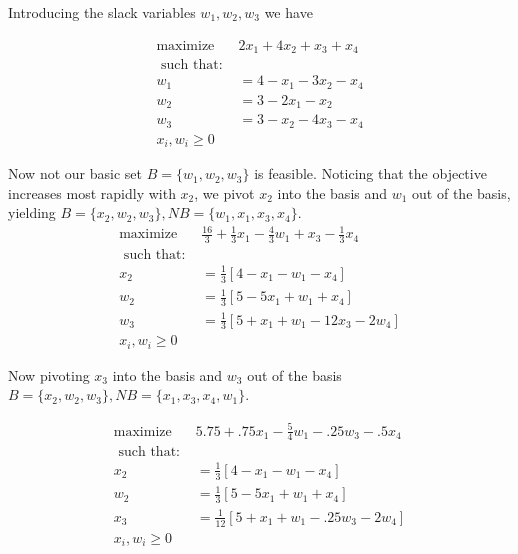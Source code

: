 \documentclass{article} %
\begin{document}
\begin{enumerate}
Introducing the slack variables $w_1,w_2, w_3$ we have

\begin{equation*}
\begin{aligned}
\mbox{maximize } &2x_1 + 4x_2+ x_3 + x_4 \\ 
\mbox{ such that: } & \\ 
w_1 &= 4 - x_1 - 3 x_2 - x_4 \\ 
w_2 &= 3 - 2x_1 - x_2 \\
w_3 &= 3 - x_2 - 4x_3 - x_4  \\ 
x_i, w_i \geq 0
\end{aligned}
\end{equation*}

Now not our basic set $B = \{ w_1, w_2, w_3 \}$ is feasible. Noticing that the objective increases most rapidly with $x_2$, we pivot $x_2$ into the basis and $w_1$ out of the basis, yielding $B = \{ x_2, w_2, w_3 \}, NB = \{w_1, x_1, x_3, x_4 \}$.
\begin{equation*}
\begin{aligned}
\mbox{maximize } & \frac{16}{3}  + \frac{1}{3} x_1 - \frac{4}{3}w_1+ x_3 - \frac{1}{3} x_4 \\ 
\mbox{ such that: } & \\ 
x_2 &= \frac{1}{3}[ 4 -  x_1 -  w_1 -  x_4] \\ 
w_2 &= \frac{1}{3} [ 5 - 5x_1  + w_1  + x_4]  \\ 
w_3 &= \frac{1}{3} [ 5 + x_1 + w_1  - 12 x_3 - 2 w_4]  \\ 
x_i, w_i \geq 0
\end{aligned}
\end{equation*}

Now pivoting $x_3$ into the basis and $w_3$ out of the basis $ B = \{x_2, w_2, w_3 \}, NB = \{x_1, x_3, x_4, w_1 \}$. 

\begin{equation*}
\begin{aligned}
\mbox{maximize } & 5.75  + .75 x_1 - \frac{5}{4}w_1 - .25 w_3 - .5 x_4 \\ 
\mbox{ such that: } & \\ 
x_2 &= \frac{1}{3}[ 4 -  x_1 -  w_1 -  x_4] \\ 
w_2 &= \frac{1}{3} [ 5 - 5x_1  + w_1  + x_4]  \\ 
x_3 &= \frac{1}{12} [ 5 + x_1 + w_1  - .25 w_3 -  2 w_4]  \\ 
x_i, w_i \geq 0
\end{aligned}
\end{equation*}


\end{enumerate}
\end{document}
